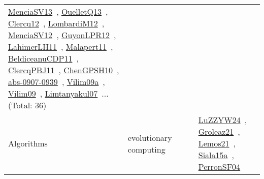 {\begin{longtable}{lp{3cm}>{\raggedright\arraybackslash}p{6cm}>{\raggedright\arraybackslash}p{6cm}>{\raggedright\arraybackslash}p{8cm}}
\href{../works/MenciaSV13.pdf}{MenciaSV13}~\cite{MenciaSV13}, \href{../works/OuelletQ13.pdf}{OuelletQ13}~\cite{OuelletQ13}, \href{../works/Clercq12.pdf}{Clercq12}~\cite{Clercq12}, \href{../works/LombardiM12.pdf}{LombardiM12}~\cite{LombardiM12}, \href{../works/MenciaSV12.pdf}{MenciaSV12}~\cite{MenciaSV12}, \href{../works/GuyonLPR12.pdf}{GuyonLPR12}~\cite{GuyonLPR12}, \href{../works/LahimerLH11.pdf}{LahimerLH11}~\cite{LahimerLH11}, \href{../works/Malapert11.pdf}{Malapert11}~\cite{Malapert11}, \href{../works/BeldiceanuCDP11.pdf}{BeldiceanuCDP11}~\cite{BeldiceanuCDP11}, \href{../works/ClercqPBJ11.pdf}{ClercqPBJ11}~\cite{ClercqPBJ11}, \href{../works/ChenGPSH10.pdf}{ChenGPSH10}~\cite{ChenGPSH10}, \href{../works/abs-0907-0939.pdf}{abs-0907-0939}~\cite{abs-0907-0939}, \href{../works/Vilim09a.pdf}{Vilim09a}~\cite{Vilim09a}, \href{../works/Vilim09.pdf}{Vilim09}~\cite{Vilim09}, \href{../works/Limtanyakul07.pdf}{Limtanyakul07}~\cite{Limtanyakul07}... (Total: 36)\\
Algorithms & evolutionary computing &  &  & \href{../works/LuZZYW24.pdf}{LuZZYW24}~\cite{LuZZYW24}, \href{../works/Groleaz21.pdf}{Groleaz21}~\cite{Groleaz21}, \href{../works/Lemos21.pdf}{Lemos21}~\cite{Lemos21}, \href{../works/Siala15a.pdf}{Siala15a}~\cite{Siala15a}, \href{../works/PerronSF04.pdf}{PerronSF04}~\cite{PerronSF04}\\

\end{longtable}}
